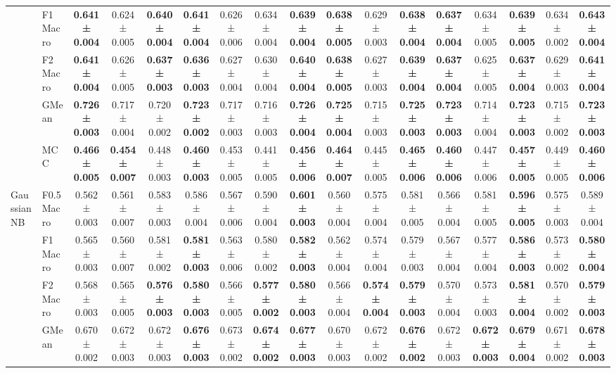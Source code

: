 \begin{table}[H]
{\begin{tabular}{llccccccccccccccc}
 & F1 Macro & \textbf{0.641 ± 0.004} & 0.624 ± 0.005 & \textbf{0.640 ± 0.004} & \textbf{0.641 ± 0.004} & 0.626 ± 0.006 & 0.634 ± 0.004 & \textbf{0.639 ± 0.004} & \textbf{0.638 ± 0.005} & 0.629 ± 0.003 & \textbf{0.638 ± 0.004} & \textbf{0.637 ± 0.004} & 0.634 ± 0.005 & \textbf{0.639 ± 0.005} & 0.634 ± 0.002 & \textbf{0.643 ± 0.004} \\
 & F2 Macro & \textbf{0.641 ± 0.004} & 0.626 ± 0.005 & \textbf{0.637 ± 0.003} & \textbf{0.636 ± 0.003} & 0.627 ± 0.004 & 0.630 ± 0.004 & \textbf{0.640 ± 0.004} & \textbf{0.638 ± 0.005} & 0.627 ± 0.003 & \textbf{0.639 ± 0.004} & \textbf{0.637 ± 0.004} & 0.625 ± 0.005 & \textbf{0.637 ± 0.004} & 0.629 ± 0.003 & \textbf{0.641 ± 0.004} \\
 & GMean & \textbf{0.726 ± 0.003} & 0.717 ± 0.004 & 0.720 ± 0.002 & \textbf{0.723 ± 0.002} & 0.717 ± 0.003 & 0.716 ± 0.003 & \textbf{0.726 ± 0.004} & \textbf{0.725 ± 0.004} & 0.715 ± 0.003 & \textbf{0.725 ± 0.003} & \textbf{0.723 ± 0.003} & 0.714 ± 0.004 & \textbf{0.723 ± 0.003} & 0.715 ± 0.002 & \textbf{0.723 ± 0.003} \\
 & MCC & \textbf{0.466 ± 0.005} & \textbf{0.454 ± 0.007} & 0.448 ± 0.003 & \textbf{0.460 ± 0.003} & 0.453 ± 0.005 & 0.441 ± 0.005 & \textbf{0.456 ± 0.006} & \textbf{0.464 ± 0.007} & 0.445 ± 0.005 & \textbf{0.465 ± 0.006} & \textbf{0.460 ± 0.006} & 0.447 ± 0.006 & \textbf{0.457 ± 0.005} & 0.449 ± 0.005 & \textbf{0.460 ± 0.006} \\
\cline{1-17}
\multirow[t]{5}{*}{GaussianNB} & F0.5 Macro & 0.562 ± 0.003 & 0.561 ± 0.007 & 0.583 ± 0.003 & 0.586 ± 0.004 & 0.567 ± 0.006 & 0.590 ± 0.004 & \textbf{0.601 ± 0.003} & 0.560 ± 0.004 & 0.575 ± 0.004 & 0.581 ± 0.005 & 0.566 ± 0.004 & 0.581 ± 0.005 & \textbf{0.596 ± 0.005} & 0.575 ± 0.003 & 0.589 ± 0.004 \\
 & F1 Macro & 0.565 ± 0.003 & 0.560 ± 0.007 & 0.581 ± 0.002 & \textbf{0.581 ± 0.003} & 0.563 ± 0.006 & 0.580 ± 0.002 & \textbf{0.582 ± 0.003} & 0.562 ± 0.004 & 0.574 ± 0.004 & 0.579 ± 0.003 & 0.567 ± 0.004 & 0.577 ± 0.004 & \textbf{0.586 ± 0.003} & 0.573 ± 0.002 & \textbf{0.580 ± 0.004} \\
 & F2 Macro & 0.568 ± 0.003 & 0.565 ± 0.005 & \textbf{0.576 ± 0.003} & \textbf{0.580 ± 0.003} & 0.566 ± 0.005 & \textbf{0.577 ± 0.002} & \textbf{0.580 ± 0.003} & 0.566 ± 0.004 & \textbf{0.574 ± 0.004} & \textbf{0.579 ± 0.003} & 0.570 ± 0.004 & 0.573 ± 0.003 & \textbf{0.581 ± 0.004} & 0.570 ± 0.002 & \textbf{0.579 ± 0.003} \\
 & GMean & 0.670 ± 0.002 & 0.672 ± 0.003 & 0.672 ± 0.003 & \textbf{0.676 ± 0.003} & 0.673 ± 0.002 & \textbf{0.674 ± 0.002} & \textbf{0.677 ± 0.003} & 0.670 ± 0.003 & 0.672 ± 0.002 & \textbf{0.676 ± 0.002} & 0.672 ± 0.003 & \textbf{0.672 ± 0.003} & \textbf{0.679 ± 0.004} & 0.671 ± 0.002 & \textbf{0.678 ± 0.003} \\

\end{tabular}}
\end{table}

